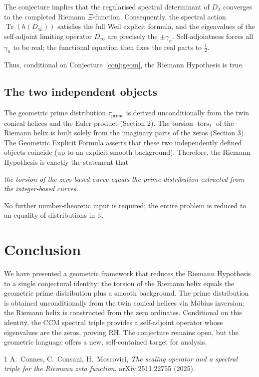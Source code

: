 \documentclass[12pt,a4paper]{article}
\newcommand{\tors}{\operatorname{tors}}
\begin{document}
The conjecture implies that the regularised spectral determinant of $D_\lambda$ converges to the completed Riemann $\Xi$‑function.  Consequently, the spectral action $\operatorname{Tr}(h(D_\infty))$ satisfies the full Weil explicit formula, and the eigenvalues of the self‑adjoint limiting operator $D_\infty$ are precisely the $\pm\gamma_n$.  Self‑adjointness forces all $\gamma_n$ to be real; the functional equation then fixes the real parts to $\frac12$.

Thus, conditional on Conjecture~\ref{conj:geom}, the Riemann Hypothesis is true.

\subsection{The two independent objects}
The geometric prime distribution $\tau_{\text{prime}}$ is derived unconditionally from the twin conical helices and the Euler product (Section 2).  The torsion $\tors_1$ of the Riemann helix is built solely from the imaginary parts of the zeros (Section 3).  The Geometric Explicit Formula asserts that these two independently defined objects coincide (up to an explicit smooth background).  Therefore, the Riemann Hypothesis is exactly the statement that

\begin{center}
\textit{the torsion of the zero‑based curve equals the prime distribution extracted from the integer‑based curves.}
\end{center}
No further number‑theoretic input is required; the entire problem is reduced to an equality of distributions in $\mathbb{R}$.

\section{Conclusion}
We have presented a geometric framework that reduces the Riemann Hypothesis to a single conjectural identity: the torsion of the Riemann helix equals the geometric prime distribution plus a smooth background.  The prime distribution is obtained unconditionally from the twin conical helices via M\"obius inversion; the Riemann helix is constructed from the zero ordinates.  Conditional on this identity, the CCM spectral triple provides a self‑adjoint operator whose eigenvalues are the zeros, proving RH.  The conjecture remains open, but the geometric language offers a new, self‑contained target for analysis.

\begin{thebibliography}{1}
A.~Connes, C.~Consani, H.~Moscovici,
\emph{The scaling operator and a spectral triple for the Riemann zeta function},
arXiv:2511.22755 (2025).
\end{thebibliography}
\end{document}
